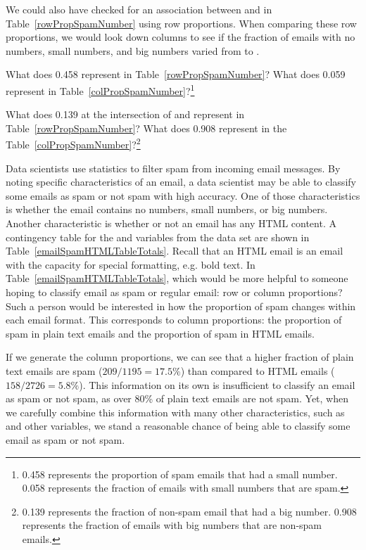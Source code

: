 \textB{\pagebreak}

We could also have checked for an association between  and  in Table~\ref{rowPropSpamNumber} using row proportions. When comparing these row proportions, we would look down columns to see if the fraction of emails with no numbers, small numbers, and big numbers varied from  to .

\begin{exercise}
What does 0.458 represent in Table~\ref{rowPropSpamNumber}? What does 0.059 represent in Table~\ref{colPropSpamNumber}?\footnote{0.458 represents the proportion of spam emails that had a small number. 0.058 represents the fraction of emails with small numbers that are spam.}
\end{exercise}

\begin{exercise}
What does 0.139 at the intersection of  and  represent in Table~\ref{rowPropSpamNumber}? What does 0.908 represent in the Table~\ref{colPropSpamNumber}?\footnote{0.139 represents the fraction of non-spam email that had a big number. 0.908 represents the fraction of emails with big numbers that are non-spam emails.}
\end{exercise}

\begin{example}{Data scientists use statistics to filter spam from incoming email messages. By noting specific characteristics of an email, a data scientist may be able to classify some emails as spam or not spam with high accuracy. One of those characteristics is whether the email contains no numbers, small numbers, or big numbers. Another characteristic is whether or not an email has any HTML content. A contingency table for the  and  variables from the  data set are shown in Table~\ref{emailSpamHTMLTableTotals}. Recall that an HTML email is an email with the capacity for special formatting, e.g. bold text. In Table~\ref{emailSpamHTMLTableTotals}, which would be more helpful to someone hoping to classify email as spam or regular email: row or column proportions?} \label{weighingRowColumnProportions}
Such a person would be interested in how the proportion of spam changes within each email format. This corresponds to column proportions: the proportion of spam in plain text emails and the proportion of spam in HTML emails.

If we generate the column proportions, we can see that a higher fraction of plain text emails are spam ($209/1195 = 17.5\%$) than compared to HTML emails ($158/2726 = 5.8\%$). This information on its own is insufficient to classify an email as spam or not spam, as over 80\% of plain text emails are not spam. Yet, when we carefully combine this information with many other characteristics, such as  and other variables, we stand a reasonable chance of being able to classify some email as spam or not spam. 
\end{example}

